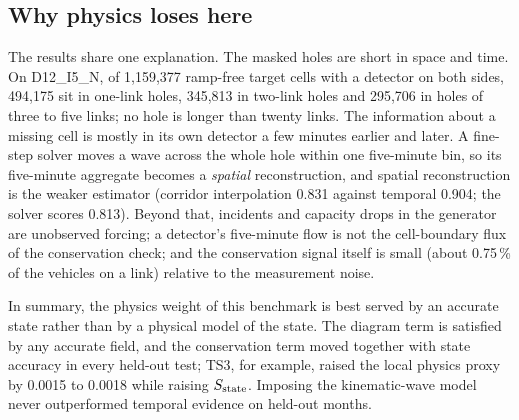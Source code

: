 \subsection{Why physics loses here}
The results share one explanation. The masked holes are short in space and time. On D12\_I5\_N, of 1,159,377
ramp-free target cells with a detector on both sides, 494,175 sit in one-link holes, 345,813 in two-link holes and
295,706 in holes of three to five links; no hole is longer than twenty links. The information about a missing cell
is mostly in its own detector a few minutes earlier and later. A fine-step solver moves a wave across the whole hole
within one five-minute bin, so its five-minute aggregate becomes a \emph{spatial} reconstruction, and spatial
reconstruction is the weaker estimator (corridor interpolation 0.831 against temporal 0.904; the solver scores 0.813).
Beyond that, incidents and capacity drops in the generator are unobserved forcing; a detector's five-minute flow is
not the cell-boundary flux of the conservation check; and the conservation signal itself is small (about 0.75\,\% of
the vehicles on a link) relative to the measurement noise.

In summary, the physics weight of this benchmark is best served by an accurate state rather than by a physical model
of the state. The diagram term is satisfied by any accurate field, and the conservation term moved together with state
accuracy in every held-out test; TS3, for example, raised the local physics proxy by 0.0015 to 0.0018 while raising
$S_{\mathrm{state}}$. Imposing the kinematic-wave model never outperformed temporal evidence on held-out months.
